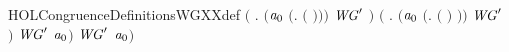 \begin{SaveVerbatim}{HOLCongruenceDefinitionsWGXXdef}
                 \ensuremath{(}\HOLSymConst{\HOLTokenExists{}} . \ensuremath{(}\ensuremath{\HOLBoundVar{a}\sb{\mathrm{0}}} \HOLSymConst{\ensuremath{=}} \ensuremath{(}\HOLTokenLambda{}.   \ensuremath{(} \ensuremath{)}\ensuremath{)}\ensuremath{)} \HOLSymConst{\HOLTokenConj{}} \ensuremath{\HOLBoundVar{WG}\sp{\prime}} \ensuremath{)} \HOLSymConst{\HOLTokenDisj{}}
                 \ensuremath{(}\HOLSymConst{\HOLTokenExists{}} . \ensuremath{(}\ensuremath{\HOLBoundVar{a}\sb{\mathrm{0}}} \HOLSymConst{\ensuremath{=}} \ensuremath{(}\HOLTokenLambda{}.  \ensuremath{(} \ensuremath{)} \ensuremath{)}\ensuremath{)} \HOLSymConst{\HOLTokenConj{}} \ensuremath{\HOLBoundVar{WG}\sp{\prime}} \ensuremath{)} \HOLSymConst{\HOLTokenImp{}}
                 \ensuremath{\HOLBoundVar{WG}\sp{\prime}} \ensuremath{\HOLBoundVar{a}\sb{\mathrm{0}}}\ensuremath{)} \HOLSymConst{\HOLTokenImp{}}
            \ensuremath{\HOLBoundVar{WG}\sp{\prime}} \ensuremath{\HOLBoundVar{a}\sb{\mathrm{0}}}\ensuremath{)}
\end{SaveVerbatim}
\newcommand{\HOLCongruenceDefinitionsWGXXdef}{\UseVerbatim{HOLCongruenceDefinitionsWGXXdef}}
